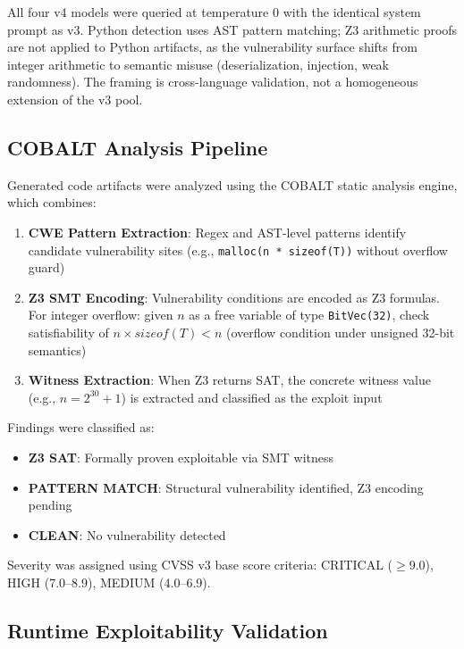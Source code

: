 \documentclass[10pt,twocolumn]{article}
\begin{document}
All four v4 models were queried at temperature 0 with the identical system
prompt as v3. Python detection uses AST pattern matching; Z3 arithmetic
proofs are not applied to Python artifacts, as the vulnerability surface
shifts from integer arithmetic to semantic misuse (deserialization,
injection, weak randomness). The framing is cross-language validation, not
a homogeneous extension of the v3 pool.

\subsection{COBALT Analysis Pipeline}

Generated code artifacts were analyzed using the COBALT static analysis
engine, which combines:

\begin{enumerate}
  \item \textbf{CWE Pattern Extraction}: Regex and AST-level patterns
    identify candidate vulnerability sites (e.g.,
    \texttt{malloc(n * sizeof(T))} without overflow guard)
  \item \textbf{Z3 SMT Encoding}: Vulnerability conditions are encoded as
    Z3 formulas. For integer overflow: given $n$ as a free variable of
    type \texttt{BitVec(32)}, check satisfiability of $n \times
    \mathit{sizeof}(T) < n$ (overflow condition under unsigned 32-bit
    semantics)
  \item \textbf{Witness Extraction}: When Z3 returns SAT, the concrete
    witness value (e.g., $n = 2^{30}+1$) is extracted and classified as
    the exploit input
\end{enumerate}

Findings were classified as:

\begin{itemize}
  \item \textbf{Z3 SAT}: Formally proven exploitable via SMT witness
  \item \textbf{PATTERN MATCH}: Structural vulnerability identified, Z3
    encoding pending
  \item \textbf{CLEAN}: No vulnerability detected
\end{itemize}

Severity was assigned using CVSS v3 base score criteria: CRITICAL
($\geq$9.0), HIGH (7.0--8.9), MEDIUM (4.0--6.9).

\subsection{Runtime Exploitability Validation}
\end{document}

